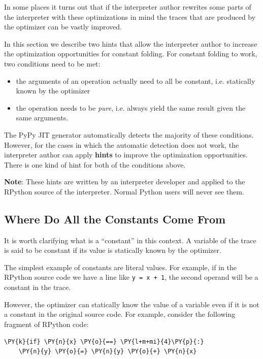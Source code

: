 \documentclass{sig-alternate}
\begin{document}
In some places it turns out that if the interpreter author rewrites some parts
of the interpreter with these optimizations in mind the traces that are produced
by the optimizer can be vastly improved.

In this section we describe two hints that allow the interpreter author to
increase the optimization opportunities for constant folding. For constant
folding to work, two conditions need
to be met:
%
\begin{itemize}
    \item the arguments of an operation actually need to all be constant,
    i.e. statically known by the optimizer
    \item the operation needs to be \emph{pure}, i.e. always yield the same result given
    the same arguments.
\end{itemize}

The PyPy JIT generator automatically detects the majority of these conditions.
However, for the cases in which the automatic detection does not work, the
interpreter author can apply \textbf{hints} to improve the optimization
opportunities. There is one kind of hint for both of the conditions above.

\textbf{Note}: These hints are written by an interpreter developer and applied to the
RPython source of the interpreter. Normal Python users will never see them.


\subsection{Where Do All the Constants Come From}

It is worth clarifying what is a ``constant'' in this context.  A variable of
the trace is said to be constant if its value is statically known by the
optimizer.

The simplest example of constants are literal values.  For example, if in the
RPython source code we have a line like \texttt{y = x + 1}, the second operand will
be a constant in the trace.

However, the optimizer can statically know the value of a variable even if it
is not a constant in the original source code. For example, consider the
following fragment of RPython code:
\begin{Verbatim}[commandchars=\\\{\}]
\PY{k}{if} \PY{n}{x} \PY{o}{==} \PY{l+m+mi}{4}\PY{p}{:}
    \PY{n}{y} \PY{o}{=} \PY{n}{y} \PY{o}{+} \PY{n}{x}
\end{Verbatim}
\end{document}
